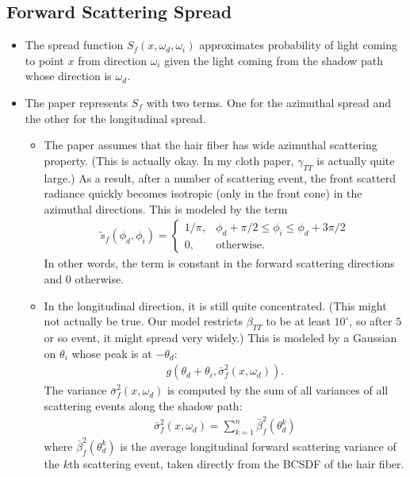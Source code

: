 \documentclass[10pt]{article}
\begin{document}
  \subsection{Forward Scattering Spread}
  \begin{itemize}
    \item The spread function $S_f(x, \omega_d, \omega_i)$ approximates probability of light coming to point $x$ from direction $\omega_i$ given the light coming from the shadow path whose direction is $\omega_d$.

    \item The paper represents $S_f$ with two terms.  One for the azimuthal spread and the other for the longitudinal spread.
    \begin{itemize}
      \item The paper assumes that the hair fiber has wide azimuthal scattering property.  (This is actually okay.  In my cloth paper, $\gamma_{TT}$ is actually quite large.)  As a result, after a number of scattering event, the front scatterd radiance quickly becomes isotropic (only in the front cone) in the azimuthal directions.  This is modeled by the term
      \begin{align*}
        \tilde{s}_f(\phi_d, \phi_i) = \begin{cases}
          1/\pi, & \phi_d + \pi/2 \leq \phi_i \leq \phi_d + 3\pi/2 \\
          0, & \mathrm{otherwise}.
        \end{cases}
      \end{align*}
      In other words, the term is constant in the forward scattering directions and $0$ otherwise.

      \item In the longitudinal direction, it is still quite concentrated.  (This might not actually be true.  Our model restricts $\beta_{TT}$ to be at least $10^\circ$, so after $5$ or so event, it might spread very widely.)  This is modeled by a Gaussian on $\theta_i$ whose peak is at $-\theta_d$:
      \begin{align*}
        g(\theta_d + \theta_i, \bar{\sigma}^2_f(x, \omega_d)).
      \end{align*}
      The variance $\bar{\sigma}^2_f(x, \omega_d)$ is computed by the sum of all variances of all scattering events along the shadow path:
      \begin{align*}
        \bar{\sigma}^2_f(x, \omega_d) = \sum_{k=1}^n \bar{\beta}_f^2(\theta_d^k)
      \end{align*}
      where $\bar{\beta}_f^2(\theta_d^k)$ is the average longitudinal forward scattering variance of the $k$th scattering event, taken directly from the BCSDF of the hair fiber.


\end{itemize}
\end{itemize}
\end{document}
